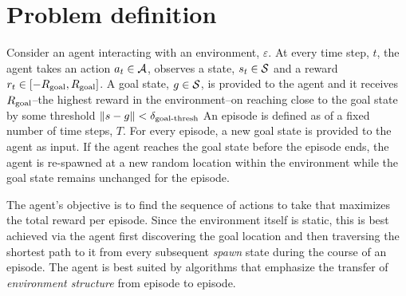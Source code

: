 \section{Problem definition}

Consider an agent interacting with an environment, $\varepsilon$. At
every time step, $t$, the agent takes an action $a_t \in \mathcal{A}$, observes a
state, $s_t \in \mathcal{S}$ and a reward $r_t \in [-R_{\text{goal}}, R_{\text{goal}}]$.
A goal state, $g \in \mathcal{S}$, is provided to the agent and it receives
$R_{\text{goal}}$--the highest reward in the environment--on reaching close to the goal
state by some threshold $\|s -g\| < \delta_{\text{goal-thresh}}$
An episode is defined as of a fixed number of time steps, $T$. For
every episode, a new goal state is provided to the agent as input. If the agent
reaches the goal state before the episode ends, the agent is 
re-spawned at a new random location within the environment while the goal state
remains unchanged for the episode.

The agent's objective is to find the sequence of actions to take that maximizes
the total reward per episode. Since the environment itself is static, this is
best achieved via the agent first discovering the goal location and then
traversing the shortest path to it from every subsequent \emph{spawn} state
during the course of an episode. The agent is best suited by algorithms that
emphasize the transfer of \emph{environment structure} from episode to episode.



%
%

%


